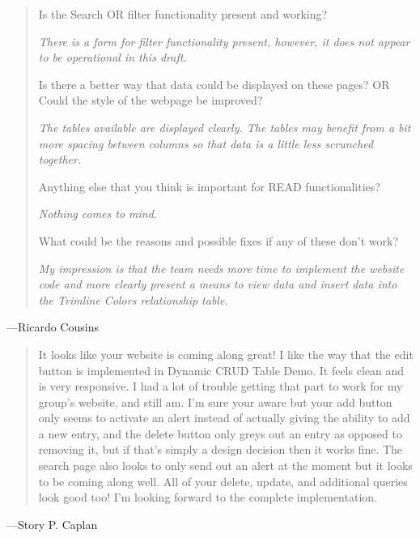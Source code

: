 \documentclass[11pt,letterpaper,oneside]{amsart}
\begin{document}
\begin{quotation}
Is the Search OR filter functionality present and working?

\emph{There is a form for filter functionality present, however, it does not appear to be operational in this draft.}

Is there a better way that data could be displayed on these pages? OR Could the style of the webpage be improved?

\emph{The tables available are displayed clearly. The tables may benefit from a bit more spacing between columns so that data is a little less scrunched together.}

Anything else that you think is important for READ functionalities?

\emph{Nothing comes to mind.}

What could be the reasons and possible fixes if any of these don't work?

\emph{My impression is that the team needs more time to implement the website code and more clearly present a means to view data and insert data into the Trimline Colors relationship table.}

\end{quotation}
---Ricardo Cousins



\begin{quotation}

It looks like your website is coming along great! I like the way that the edit button is implemented in Dynamic CRUD Table Demo. It feels clean and is very responsive. I had a lot of trouble getting that part to work for my group's website, and still am. I'm sure your aware but your add button only seems to activate an alert instead of actually giving the ability to add a new entry, and the delete button only greys out an entry as opposed to removing it, but if that's simply a design decision then it works fine. The search page also looks to only send out an alert at the moment but it looks to be coming along well. All of your delete, update, and additional queries look good too! I'm looking forward to the complete implementation.

\end{quotation}

---Story P. Caplan
\end{document}
